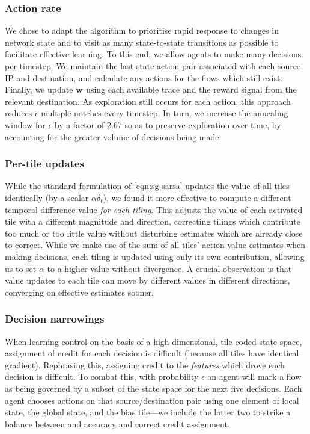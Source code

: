 \documentclass[10pt, times, conference, letterpaper]{IEEEtran}
\newcommand{\wvec}[1]{\ensuremath{\bm{w}_{#1}}}
\begin{document}
\subsubsection{Action rate}
We chose to adapt the algorithm to prioritise rapid response to changes in network state and to visit as many state-to-state transitions as possible to facilitate effective learning.
To this end, we allow agents to make many decisions per timestep.
We maintain the last state-action pair associated with each source IP and destination, and calculate any actions for the flows which still exist.
Finally, we update $\wvec{}$ using each available trace and the reward signal from the relevant destination.
As exploration still occurs for each action, this approach reduces $\epsilon$ multiple notches every timestep.
In turn, we increase the annealing window for $\epsilon$ by a factor of \num{2.67} so as to preserve exploration over time, by accounting for the greater volume of decisions being made.

\subsubsection{Per-tile updates}
While the standard formulation of \cref{eqn:sg-sarsa} updates the value of all tiles identically (by a scalar $\alpha \delta_t$), we found it more effective to compute a different temporal difference value \emph{for each tiling}.
This adjusts the value of each activated tile with a different magnitude and direction, correcting tilings which contribute too much or too little value without disturbing estimates which are already close to correct.
While we make use of the sum of all tiles' action value estimates when making decisions, each tiling is updated using only its own contribution, allowing us to set $\alpha$ to a higher value without divergence.
A crucial observation is that value updates to each tile can move by different values in different directions, converging on effective estimates sooner.

\subsubsection{Decision narrowings}
When learning control on the basis of a high-dimensional, tile-coded state space, assignment of credit for each decision is difficult (because all tiles have identical gradient).
Rephrasing this, assigning credit to the \emph{features} which drove each decision is difficult.
To combat this, with probability $\epsilon$ an agent will mark a flow as being governed by a subset of the state space for the next five decisions.
Each agent chooses actions on that source/destination pair using one element of local state, the global state, and the bias tile---we include the latter two to strike a balance between and accuracy and correct credit assignment.
\end{document}
